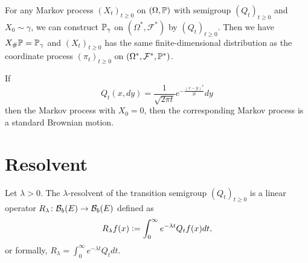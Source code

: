 \begin{rmk}
    For any Markov process $(X_t)_{t \geq 0}$ on $(\Omega,\mathbb{P})$ with semigroup $(Q_t)_{t \geq 0}$ and $X_0 \sim \gamma$, we can construct $\mathbb{P}_\gamma$ on $(\Omega^*,\mathcal{F}^*)$ by $(Q_t)_{t \geq 0}$. Then we have $X_\#\mathbb{P} = \mathbb{P}_\gamma$ and $(X_t)_{t \geq 0}$ has the same finite-dimensional distribution as the coordinate process $(\pi_t)_{t \geq 0}$ on $(\Omega^*,\mathcal{F}^*,\mathbb{P}^*)$.
\end{rmk}

\begin{exam}
    If
    \begin{equation*}
        Q_t(x,dy) = \frac{1}{\sqrt{2\pi t}}e^{-\frac{(x-y)^2}{2t}}dy
    \end{equation*}
    then the Markov process with $X_0 = 0$, then the corresponding Markov process is a standard Brownian motion.
\end{exam}

\section{Resolvent}

\begin{defn}[Resolvent]
    Let $\lambda > 0$. The $\lambda$-resolvent of the transition semigroup $(Q_t)_{t \geq 0}$ is a linear operator $R_\lambda \colon \mathcal{B}_b(E) \rightarrow \mathcal{B}_b(E)$ defined as
    \begin{equation*}
        R_\lambda f(x) \vcentcolon= \int_0^\infty e^{-\lambda t} Q_tf(x) dt,
    \end{equation*}
    or formally, $R_\lambda = \int_0^\infty e^{-\lambda t}Q_t dt$.
\end{defn}

